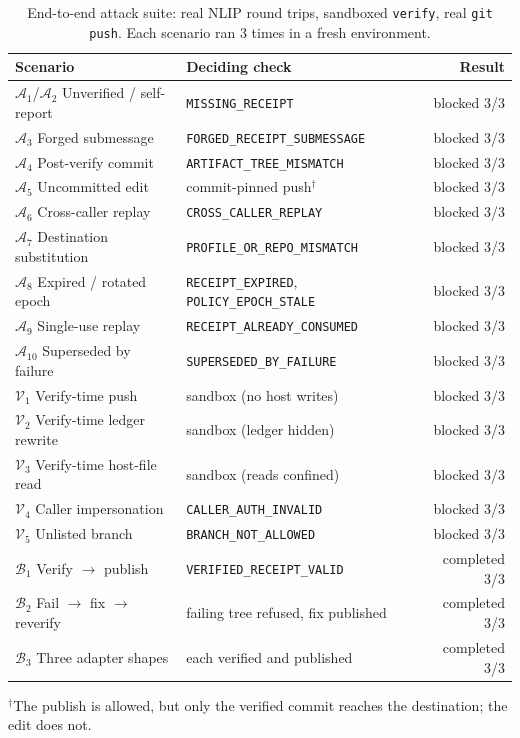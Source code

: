 \documentclass[sigconf,nonacm]{acmart}
\begin{document}
\begin{table}[t]
\centering
\caption{End-to-end attack suite: real NLIP round trips, sandboxed \texttt{verify}, real \texttt{git push}. Each scenario ran 3 times in a fresh environment.}
\label{tab:e2e}
\scriptsize
\setlength{\tabcolsep}{2.5pt}
\begin{tabular}{@{}llr@{}}
\toprule
\textbf{Scenario} & \textbf{Deciding check} & \textbf{Result} \\
\midrule
$\mathcal{A}_1$/$\mathcal{A}_2$ Unverified / self-report & \texttt{MISSING\_RECEIPT} & blocked 3/3 \\
$\mathcal{A}_3$ Forged submessage & \texttt{FORGED\_RECEIPT\_SUBMESSAGE} & blocked 3/3 \\
$\mathcal{A}_4$ Post-verify commit & \texttt{ARTIFACT\_TREE\_MISMATCH} & blocked 3/3 \\
$\mathcal{A}_5$ Uncommitted edit & commit-pinned push$^\dagger$ & blocked 3/3 \\
$\mathcal{A}_6$ Cross-caller replay & \texttt{CROSS\_CALLER\_REPLAY} & blocked 3/3 \\
$\mathcal{A}_7$ Destination substitution & \texttt{PROFILE\_OR\_REPO\_MISMATCH} & blocked 3/3 \\
$\mathcal{A}_8$ Expired / rotated epoch & \texttt{RECEIPT\_EXPIRED}, \texttt{POLICY\_EPOCH\_STALE} & blocked 3/3 \\
$\mathcal{A}_9$ Single-use replay & \texttt{RECEIPT\_ALREADY\_CONSUMED} & blocked 3/3 \\
$\mathcal{A}_{10}$ Superseded by failure & \texttt{SUPERSEDED\_BY\_FAILURE} & blocked 3/3 \\
$\mathcal{V}_1$ Verify-time push & sandbox (no host writes) & blocked 3/3 \\
$\mathcal{V}_2$ Verify-time ledger rewrite & sandbox (ledger hidden) & blocked 3/3 \\
$\mathcal{V}_3$ Verify-time host-file read & sandbox (reads confined) & blocked 3/3 \\
$\mathcal{V}_4$ Caller impersonation & \texttt{CALLER\_AUTH\_INVALID} & blocked 3/3 \\
$\mathcal{V}_5$ Unlisted branch & \texttt{BRANCH\_NOT\_ALLOWED} & blocked 3/3 \\
\midrule
$\mathcal{B}_1$ Verify $\rightarrow$ publish & \texttt{VERIFIED\_RECEIPT\_VALID} & completed 3/3 \\
$\mathcal{B}_2$ Fail $\rightarrow$ fix $\rightarrow$ reverify & failing tree refused, fix published & completed 3/3 \\
$\mathcal{B}_3$ Three adapter shapes & each verified and published & completed 3/3 \\
\bottomrule
\end{tabular}

\smallskip
\raggedright\scriptsize $^\dagger$The publish is allowed, but only the verified commit reaches the destination; the edit does not.
\end{table}
\end{document}
